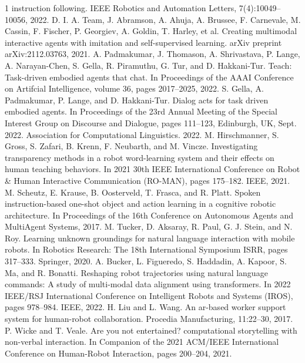 \documentclass[journal]{IEEEtran}
\begin{document}
\begin{thebibliography}{1}
  instruction following. IEEE Robotics and Automation Letters, 7(4):10049–10056, 2022.
   D. I. A. Team, J. Abramson, A. Ahuja, A. Brussee, F. Carnevale, M. Cassin, F. Fischer, P. Georgiev, A. Goldin,
  T. Harley, et al. Creating multimodal interactive agents with imitation and self-supervised learning. arXiv preprint
  arXiv:2112.03763, 2021.
   A. Padmakumar, J. Thomason, A. Shrivastava, P. Lange, A. Narayan-Chen, S. Gella, R. Piramuthu, G. Tur, and
  D. Hakkani-Tur. Teach: Task-driven embodied agents that chat. In Proceedings of the AAAI Conference on Artifcial Intelligence, volume 36, pages 2017–2025, 2022.
   S. Gella, A. Padmakumar, P. Lange, and D. Hakkani-Tur. Dialog acts for task driven embodied agents. In Proceedings
  of the 23rd Annual Meeting of the Special Interest Group on Discourse and Dialogue, pages 111–123, Edinburgh, UK,
  Sept. 2022. Association for Computational Linguistics. 2022.
   M. Hirschmanner, S. Gross, S. Zafari, B. Krenn, F. Neubarth, and M. Vincze. Investigating transparency methods in a
  robot word-learning system and their effects on human teaching behaviors. In 2021 30th IEEE International Conference
  on Robot \& Human Interactive Communication (RO-MAN), pages 175–182. IEEE, 2021.
   M. Scheutz, E. Krause, B. Oosterveld, T. Frasca, and R. Platt. Spoken instruction-based one-shot object and action learning in a cognitive robotic architecture. In Proceedings of the 16th Conference on Autonomous Agents and MultiAgent
  Systems, 2017.
   M. Tucker, D. Aksaray, R. Paul, G. J. Stein, and N. Roy. Learning unknown groundings for natural language interaction
  with mobile robots. In Robotics Research: The 18th International Symposium ISRR, pages 317–333. Springer, 2020.
   A. Bucker, L. Figueredo, S. Haddadin, A. Kapoor, S. Ma, and R. Bonatti. Reshaping robot trajectories using
  natural language commands: A study of multi-modal data alignment using transformers. In 2022 IEEE/RSJ
  International Conference on Intelligent Robots and Systems (IROS), pages 978–984. IEEE, 2022.
   H. Liu and L. Wang. An ar-based worker support system for human-robot collaboration. Procedia Manufacturing,
  11:22–30, 2017.
   P. Wicke and T. Veale. Are you not entertained? computational storytelling with non-verbal interaction. In
  Companion of the 2021 ACM/IEEE International Conference on Human-Robot Interaction, pages 200–204, 2021.

\end{thebibliography}
\end{document}

